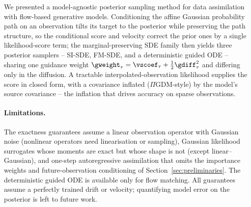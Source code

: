 We presented a model-agnostic posterior sampling method for data assimilation with flow-based generative models. Conditioning the affine Gaussian probability path on an observation tilts its target to the posterior while preserving the path structure, so the conditional score and velocity correct the prior ones by a single likelihood-score term; the marginal-preserving SDE family then yields three posterior samplers -- SI-SDE, FM-SDE, and a deterministic guided ODE -- sharing one guidance weight $\gweight_\tau=\vscoef_\tau+\tfrac12\gdiff_\tau^2$ and differing only in the diffusion. A tractable interpolated-observation likelihood supplies the score in closed form, with a covariance inflated ($\Pi$GDM-style) by the model's source covariance -- the inflation that drives accuracy on sparse observations.

\paragraph{Limitations.}
The exactness guarantees assume a linear observation operator with Gaussian noise (nonlinear operators need linearisation or sampling), Gaussian likelihood surrogates whose moments are exact but whose shape is not (except linear--Gaussian), and one-step autoregressive assimilation that omits the importance weights and future-observation conditioning of Section~\ref{sec:preliminaries}. The deterministic guided ODE is available only for flow matching. All guarantees assume a perfectly trained drift or velocity; quantifying model error on the posterior is left to future work.
